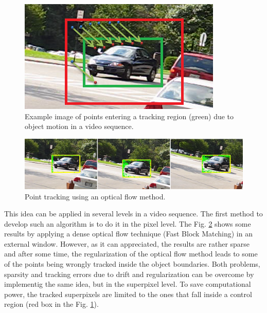    \begin{figure}[thpb]
      \centering
      \includegraphics[height=0.285\textheight]{../images/tracking_points.png}
      \caption{Example image of points entering a tracking region (green) due to object motion in a video sequence.}
      \label{figurelabel_entering}
   \end{figure}
\setlength{\belowcaptionskip}{-10pt}

   \begin{figure}[thpb]
      \centering
      \includegraphics[width=1\textwidth]{../images/pointTr.png}
      \caption{Point tracking using an optical flow method.}
      \label{pointtr}
   \end{figure}


This idea can be applied in several levels in a video sequence. The first method to develop such an algorithm is to do it in the pixel level. The Fig. \ref{pointtr} shows some results by applying 
a dense optical flow technique (Fast Block Matching) in an external window. However, as it can appreciated, the results are rather sparse and after some time, the regularization of the 
optical flow method leads to some of the points being wrongly tracked inside the object boundaries. Both problems, sparsity and tracking errors due to drift and regularization can be 
overcome by implementig the same idea, but in the superpixel level.
To save computational power, the tracked superpixels are 
limited to the ones that fall inside a control region (red box in the Fig.  \ref{figurelabel_entering}). 

